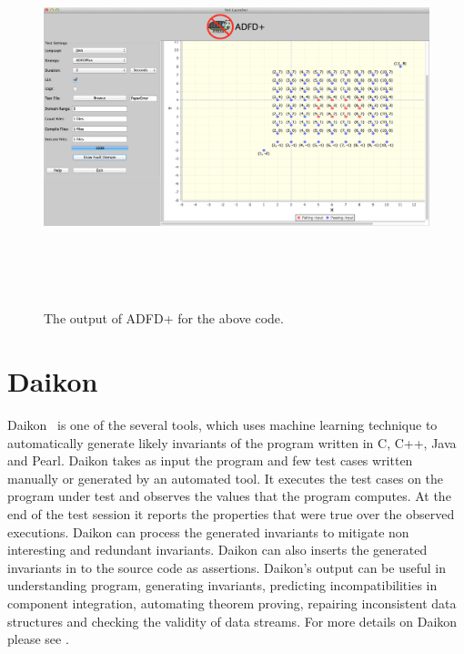 \begin{figure}[ht]
\centering
\includegraphics[width=17.5cm,height=11cm]{chapter6/exampleError.png}
\caption{The output of ADFD+ for the above code.}
\label{fig:adfdPlusExample}
\end{figure}



\section{Daikon}
Daikon~\cite{ernst2007daikon} is one of the several tools, which uses machine learning technique to automatically generate likely invariants of the program written in C, C++, Java and Pearl. Daikon takes as input the program and few test cases written manually or generated by an automated tool. It executes the test cases on the program under test and observes the values that the program computes. At the end of the test session it reports the properties that were true over the observed executions. Daikon can process the generated invariants to mitigate non interesting and redundant invariants. Daikon can also inserts the generated invariants in to the source code as assertions. Daikon's output can be useful in understanding program, generating invariants, predicting incompatibilities in component integration, automating theorem proving, repairing inconsistent data structures and checking the validity of data streams. For more details on Daikon please see \cite{}.






